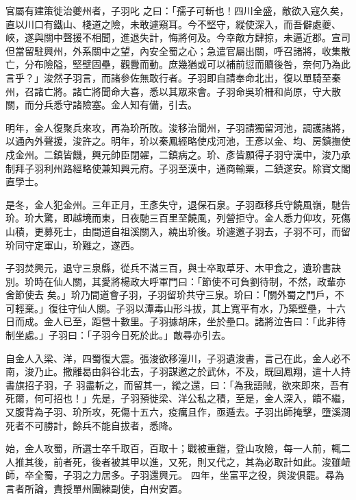 \begin{pinyinscope}
 官屬有建策徙治夔州者，子羽叱
 之曰：「孺子可斬也！四川全盛，敵欲入寇久矣，直以川口有鐵山、棧道之險，未敢遽窺耳。今不堅守，縱使深入，而吾僻處夔、峽，遂與關中聲援不相聞，進退失計，悔將何及。今幸敵方肆掠，未逼近郡。宣司但當留駐興州，外系關中之望，內安全蜀之心；急遣官屬出關，呼召諸將，收集散亡，分布險隘，堅壁固壘，觀釁而動。庶幾猶或可以補前愆而贖後咎，奈何乃為此言乎？」浚然子羽言，而諸參佐無敢行者。子羽即自請奉命北出，復以單騎至秦
 州，召諸亡將。諸亡將聞命大喜，悉以其眾來會。子羽命吳玠柵和尚原，守大散關，而分兵悉守諸險塞。金人知有備，引去。



 明年，金人復聚兵來攻，再為玠所敗。浚移治閬州，子羽請獨留河池，調護諸將，以通內外聲援，浚許之。明年，玠以秦鳳經略使戍河池，王彥以金、均、房鎮撫使戍金州。二鎮皆饑，興元帥臣閉糴，二鎮病之。玠、彥皆願得子羽守漢中，浚乃承制拜子羽利州路經略使兼知興元府。子羽至漢中，通商輸粟，二鎮遂安。除寶文閣
 直學士。



 是冬，金人犯金州。三年正月，王彥失守，退保石泉。子羽亟移兵守饒風嶺，馳告玠。玠大驚，即越境而東，日夜馳三百里至饒風，列營拒守。金人悉力仰攻，死傷山積，更募死士，由間道自祖溪關入，繞出玠後。玠遽邀子羽去，子羽不可，而留玠同守定軍山，玠難之，遂西。



 子羽焚興元，退守三泉縣，從兵不滿三百，與士卒取草牙、木甲食之，遺玠書訣別。玠時在仙人關，其愛將楊政大呼軍門曰：「節使不可負劉待制，不然，政輩亦舍節使去
 矣。」玠乃間道會子羽，子羽留玠共守三泉。玠曰：「關外蜀之門戶，不可輕棄。」復往守仙人關。子羽以潭毒山形斗拔，其上寬平有水，乃築壁壘，十六日而成。金人已至，距營十數里。子羽據胡床，坐於壘口。諸將泣告曰：「此非待制坐處。」子羽曰：「子羽今日死於此。」敵尋亦引去。



 自金人入梁、洋，四蜀復大震。張浚欲移潼川，子羽遺浚書，言己在此，金人必不南，浚乃止。撒離曷由斜谷北去，子羽謀邀之於武休，不及，既回鳳翔，遣十人持書旗招子羽，子
 羽盡斬之，而留其一，縱之還，曰：「為我語賊，欲來即來，吾有死爾，何可招也！」先是，子羽預徙梁、洋公私之積，至是，金人深入，饋不繼，又腹背為子羽、玠所攻，死傷十五六，疫癘且作，亟遁去。子羽出師掩擊，墮溪澗死者不可勝計，餘兵不能自拔者，悉降。



 始，金人攻蜀，所選士卒千取百，百取十；戰被重鎧，登山攻險，每一人前，輒二人推其後，前者死，後者被其甲以進，又死，則又代之，其為必取計如此。浚雖衄師，卒全蜀，子羽之力居多。子羽還興元。
 四年，坐富平之役，與浚俱罷。尋為言者所論，責授單州團練副使，白州安置。




\end{pinyinscope}
